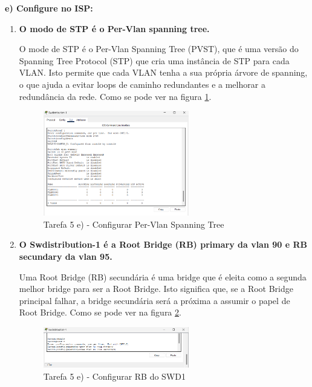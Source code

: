\documentclass[11pt,english, openright, oneside]{book}
\begin{document}
\textbf{e) Configure no ISP:}
\begin{enumerate}[label=\Roman*.]
    \item \textbf{O modo de STP é o Per-Vlan spanning tree.}
    \vspace{0.2cm}

    O mode de STP é o Per-Vlan Spanning Tree (PVST), que é uma versão do
    Spanning Tree Protocol (STP) que cria uma instância de STP para cada VLAN.
    Isto permite que cada VLAN tenha a sua própria árvore de spanning, o que
    ajuda a evitar loops de caminho redundantes e a melhorar a redundância da
    rede. Como se pode ver na figura \ref{fig:5.e.1}.

    \begin{figure}[H]
        \centering
        \includegraphics[width=0.6\textwidth]{imagens/Tarefa5/5.e.1.png}
        \caption{Tarefa 5 e) - Configurar Per-Vlan Spanning Tree}
        \label{fig:5.e.1}
    \end{figure}

    \vspace{0.8cm}

    \item \textbf{O Swdistribution-1 é a Root Bridge (RB) primary da vlan 90 e
    RB secundary da vlan 95.}
    \vspace{0.2cm}

    Uma Root Bridge (RB) secundária é uma bridge que é eleita como a segunda
    melhor bridge para ser a Root Bridge. Isto significa que, se a Root Bridge
    principal falhar, a bridge secundária será a próxima a assumir o papel de
    Root Bridge. Como se pode ver na figura \ref{fig:5.e.2}.

    \begin{figure}[H]
        \centering
        \includegraphics[width=0.6\textwidth]{imagens/Tarefa5/5.e.2.png}
        \caption{Tarefa 5 e) - Configurar RB do SWD1}
        \label{fig:5.e.2}
    \end{figure}


\end{enumerate}
\end{document}
